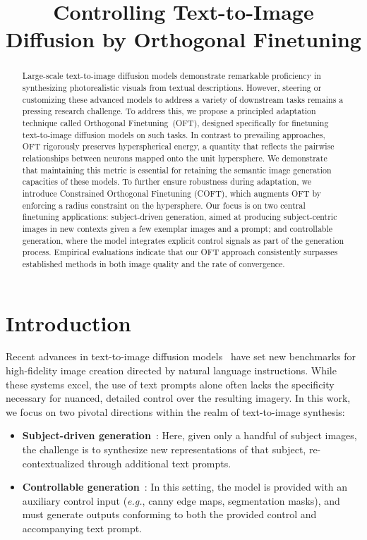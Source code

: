 \title{Controlling Text-to-Image Diffusion by Orthogonal Finetuning}

\begin{abstract}
Large-scale text-to-image diffusion models demonstrate remarkable proficiency in synthesizing photorealistic visuals from textual descriptions. However, steering or customizing these advanced models to address a variety of downstream tasks remains a pressing research challenge. To address this, we propose a principled adaptation technique called Orthogonal Finetuning~(OFT), designed specifically for finetuning text-to-image diffusion models on such tasks. In contrast to prevailing approaches, OFT rigorously preserves hyperspherical energy, a quantity that reflects the pairwise relationships between neurons mapped onto the unit hypersphere. We demonstrate that maintaining this metric is essential for retaining the semantic image generation capacities of these models. To further ensure robustness during adaptation, we introduce Constrained Orthogonal Finetuning (COFT), which augments OFT by enforcing a radius constraint on the hypersphere. Our focus is on two central finetuning applications: subject-driven generation, aimed at producing subject-centric images in new contexts given a few exemplar images and a prompt; and controllable generation, where the model integrates explicit control signals as part of the generation process. Empirical evaluations indicate that our OFT approach consistently surpasses established methods in both image quality and the rate of convergence.
\end{abstract}

\section{Introduction}

Recent advances in text-to-image diffusion models~\cite{saharia2022photorealistic,ramesh2022hierarchical,rombach2022high} have set new benchmarks for high-fidelity image creation directed by natural language instructions. While these systems excel, the use of text prompts alone often lacks the specificity necessary for nuanced, detailed control over the resulting imagery. In this work, we focus on two pivotal directions within the realm of text-to-image synthesis:

\begin{itemize}[leftmargin=*,nosep]

    \item \textbf{Subject-driven generation}~\cite{ruiz2023dreambooth}: Here, given only a handful of subject images, the challenge is to synthesize new representations of that subject, re-contextualized through additional text prompts.
    \item \textbf{Controllable generation}~\cite{zhang2023adding,mou2023t2i}: In this setting, the model is provided with an auxiliary control input (\emph{e.g.}, canny edge maps, segmentation masks), and must generate outputs conforming to both the provided control and accompanying text prompt.
\end{itemize}


